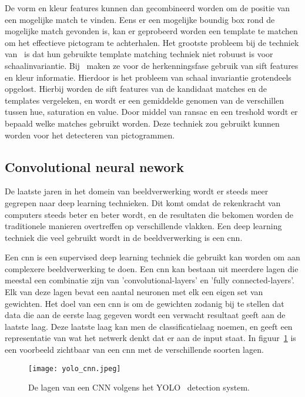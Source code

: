             De vorm en kleur features kunnen dan gecombineerd worden om de positie van een mogelijke match te vinden. Eens er een mogelijke boundig box rond de mogelijke match gevonden is,
            kan er geprobeerd worden een template te matchen om het effectieve pictogram te achterhalen. Het grootste probleem bij de techniek van~\cite{Fang2003} is
            dat hun gebruikte template matching techniek niet robuust is voor schaalinvariantie.
            Bij~\cite{Zabihi2017} maken ze voor de herkenningsfase gebruik van \gls{sift}\cite{Lowe1999} features en kleur informatie.
            Hierdoor is het probleem van schaal invariantie grotendeels opgelost.
            Hierbij worden de \gls{sift} features van de kandidaat matches en de templates vergeleken, en wordt er een gemiddelde genomen van de verschillen tussen hue, saturation en value.
            Door middel van \gls{ransac} en een treshold wordt er bepaald welke matches gebruikt worden. Deze techniek zou gebruikt kunnen worden voor het detecteren van pictogrammen.

        
        \subsection{Convolutional neural nework} \label{sec:yolo}
            De laatste jaren in het domein van beeldverwerking wordt er steeds meer gegrepen naar deep learning technieken. Dit komt omdat de rekenkracht van computers steeds beter en beter wordt, en de resultaten die bekomen worden
            de traditionele manieren overtreffen op verschillende vlakken. Een deep learning techniek die veel gebruikt wordt in de beeldverwerking is een \gls{cnn}.

            Een \gls{cnn} is een supervised deep learning techniek die gebruikt kan worden om aan complexere beeldverwerking te doen.
            Een \gls{cnn} kan bestaan uit meerdere lagen die meestal een combinatie zijn van 'convolutional-layers' en 'fully connected-layers'. Elk van deze lagen bevat een aantal neuronen met elk een eigen set van gewichten.
            Het doel van een \gls{cnn} is om de gewichten zodanig bij te stellen dat data die aan de eerste laag gegeven wordt een verwacht resultaat geeft aan de laatste laag. 
            Deze laatste laag kan men de classificatielaag noemen, en geeft een representatie van wat het netwerk denkt dat er aan de input staat. In figuur~\ref{fig:yolo_cnn} is een voorbeeld zichtbaar van een \gls{cnn} met de verschillende soorten lagen.

            \begin{figure}[!htb]
                \centering
                \texttt{[image: yolo\_cnn.jpeg]}
                \caption{De lagen van een CNN volgens het YOLO~\cite{Redmon_2016} detection system.}
                \label{fig:yolo_cnn}
            \end{figure}

